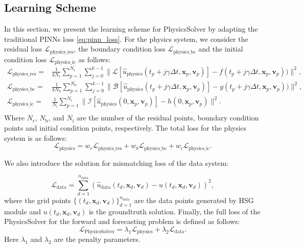 \documentclass[preprint,11pt]{elsarticle}
\newcommand{\bx}{\boldsymbol{x}}
\newcommand{\bv}{\boldsymbol{v}}
\begin{document}
\subsection{Learning Scheme}
In this section, we present the learning scheme for PhysicsSolver by adapting the traditional PINNs loss \eqref{eq:pinn_loss}. For the physics system, we consider the residual loss $\mathcal{L}_\text{physics\_res}$, the boundary condition loss $\mathcal{L}_\text{physics\_bc}$ and the initial condition loss $\mathcal{L}_\text{physics\_ic}$ as follows:
\begin{equation}
\begin{aligned}
    \mathcal{L}_\text{physics\_res} = &\frac{1}{kN_\text{r}}\sum_{p=1}^{N_\text{r}}\sum_{j=0}^{k-1} \|\mathcal{L}[\hat{u}_{\text{physics}}(t_p+j \gamma \Delta t, \boldsymbol{x}_p,\boldsymbol{v}_p)] - f(t_p+j \gamma \Delta t,\boldsymbol{x}_p, \boldsymbol{v}_p))\|^2,\\
    \mathcal{L}_\text{physics\_bc} = &\frac{1}{kN_\text{b}}\sum_{p=1}^{N_\text{b}}\sum_{j=0}^{k-1} \|\mathcal{B}[\hat{u}_{\text{physics}}(t_p+j \gamma\Delta t, \boldsymbol{x}_p, \boldsymbol{v}_p)] - g(t_p+j \gamma\Delta t, \boldsymbol{x}_p, \boldsymbol{v}_p))\|^2,\\
    \mathcal{L}_\text{physics\_ic} =& \frac{1}{N_\text{i}} \sum_{p=1}^{N_\text{i}} \|\mathcal{I}[\hat{u}_{\text{physics}}(0, \boldsymbol{x}_p,\boldsymbol{v}_p)] - h(0, \boldsymbol{x}_p,\boldsymbol{v}_p)\|^2. \\
\end{aligned} 
\label{eqn:obj}
\end{equation}
Where $N_\text{r}$, $N_\text{b}$, and $N_\text{i}$ are the number of the residual points, boundary condition points and initial condition points, respectively. The total loss for the physics system is as follows:
\begin{equation}\label{loss_physics}
    \mathcal{L}_{\text{physics}} = w_r \mathcal{L}_\text{physics\_res}  + w_b \mathcal{L}_\text{physics\_bc} + w_i \mathcal{L}_\text{physics\_ic}.
\end{equation}

We also introduce the solution for mismatching loss of the data system:

\begin{equation} \label{loss_data}
    \mathcal{L}_{\text{data}} = \sum_{d=1}^{n_{\text{data}}} (\hat{u}_{\text{data}}(t_d,\bx_d, \bv_d) - u(t_d, \bx_d,\bv_d))^2,
\end{equation}
where the grid points $\{(t_d, \bx_d,\bv_d)\}_{d=1}^{n_{\text{data}}}$ are the data points generated by HSG module and $u(t_d, \bx_d, \bv_d)$ is the groundtruth solution. Finally, the full loss of the PhysicsSolver for the forward and forecasting problem is defined as follows:
\begin{equation} \label{loss_total}
    \mathcal{L}_{\text{PhysicsSolver}} = \lambda_1 \mathcal{L}_\text{physics} 
 + \lambda_2 \mathcal{L}_{\text{data}}.
\end{equation}
Here $\lambda_1$ and $\lambda_2$ are the penalty parameters.
\end{document}

